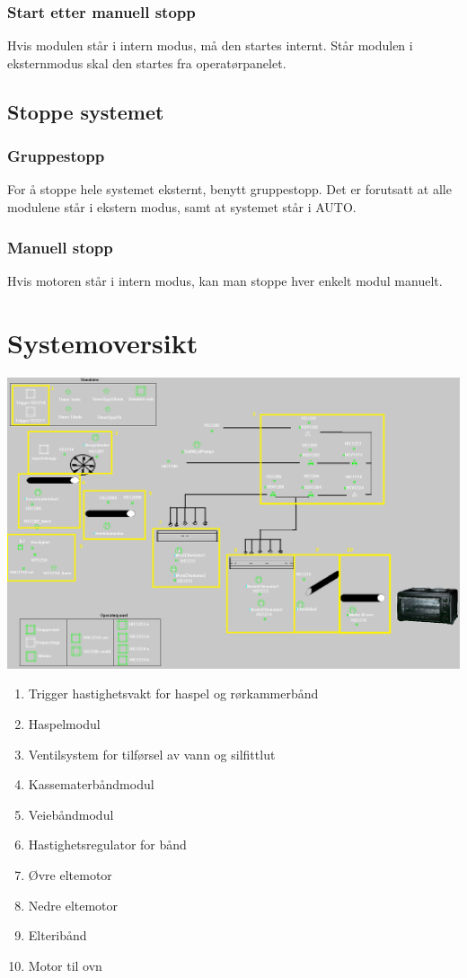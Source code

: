 \subsubsection*{Start etter manuell stopp}
Hvis modulen står i intern modus, må den startes internt. Står modulen i eksternmodus skal den startes fra operatørpanelet. 

\subsection{Stoppe systemet}
\subsubsection*{Gruppestopp}
For å stoppe hele systemet eksternt, benytt gruppestopp. Det er forutsatt at alle modulene står i ekstern modus, samt at systemet står i AUTO. 
\subsubsection*{Manuell stopp}
Hvis motoren står i intern modus, kan man stoppe hver enkelt modul manuelt. 

\newpage

\section{Systemoversikt}

\includegraphics[width=\textwidth]{oversikt.png}

\begin{enumerate}
  \item Trigger hastighetsvakt for haspel og rørkammerbånd
  \item Haspelmodul
  \item Ventilsystem for tilførsel av vann og silfittlut
  \item Kassematerbåndmodul
  \item Veiebåndmodul
  \item Hastighetsregulator for bånd
  \item Øvre eltemotor
  \item Nedre eltemotor
  \item Elteribånd
  \item Motor til ovn
\end{enumerate}
